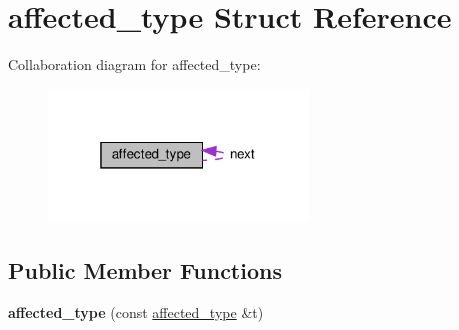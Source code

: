 \hypertarget{structaffected__type}{}\section{affected\+\_\+type Struct Reference}
\label{structaffected__type}


Collaboration diagram for affected\+\_\+type\+:\nopagebreak
\begin{figure}[H]
\begin{center}
\leavevmode
\includegraphics[width=196pt]{structaffected__type__coll__graph}
\end{center}
\end{figure}
\subsection*{Public Member Functions}
\begin{DoxyCompactItemize}
\item 
\mbox{\label{structaffected__type_a436c00f0d935d8d1675818110b6b6614}} 
{\bfseries affected\+\_\+type} (const \hyperlink{structaffected__type}{affected\+\_\+type} \&t)
\end{DoxyCompactItemize}
